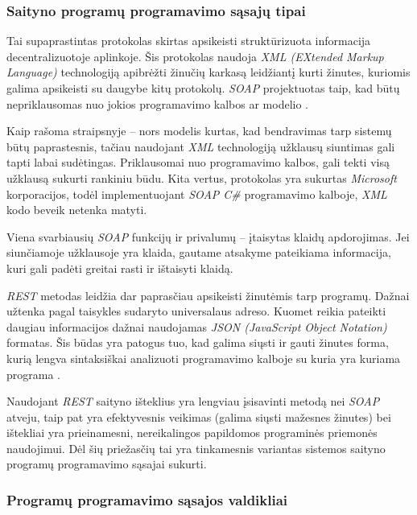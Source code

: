 \documentclass{VUMIFPSkursinis}
\begin{document}
\subsubsection{Saityno programų programavimo sąsajų tipai}


Tai supaprastintas protokolas skirtas apsikeisti struktūrizuota informacija decentralizuotoje aplinkoje. Šis protokolas naudoja \textit{XML (EXtended Markup Language)} technologiją apibrėžti žinučių karkasą leidžiantį kurti žinutes, kuriomis galima apsikeisti su daugybe kitų protokolų. \textit{SOAP} projektuotas taip, kad būtų nepriklausomas nuo jokios programavimo kalbos ar modelio \cite{SoapDocs}.

Kaip rašoma straipsnyje \cite{SoapRest} – nors modelis kurtas, kad bendravimas tarp sistemų būtų paprastesnis, tačiau naudojant \textit{XML} technologiją užklausų siuntimas gali tapti labai sudėtingas. Priklausomai nuo programavimo kalbos, gali tekti visą užklausą sukurti rankiniu būdu. Kita vertus, protokolas yra sukurtas \textit{Microsoft} korporacijos, todėl implementuojant \textit{SOAP C\#} programavimo kalboje, \textit{XML} kodo beveik netenka matyti.

Viena svarbiausių \textit{SOAP} funkcijų ir privalumų – įtaisytas klaidų apdorojimas. Jei siunčiamoje užklausoje yra klaida, gautame atsakyme pateikiama informacija, kuri gali padėti greitai rasti ir ištaisyti klaidą.


\textit{REST} metodas leidžia dar paprasčiau apsikeisti žinutėmis tarp programų. Dažnai užtenka pagal taisykles sudaryto universalaus adreso. Kuomet reikia pateikti daugiau informacijos dažnai naudojamas \textit{JSON (JavaScript Object Notation)} formatas. Šis būdas yra patogus tuo, kad galima siųsti ir gauti žinutes forma, kurią lengva sintaksiškai analizuoti programavimo kalboje su kuria yra kuriama programa \cite{SoapRest}.

Naudojant \textit{REST} saityno išteklius yra lengviau įsisavinti metodą nei \textit{SOAP} atveju, taip pat yra efektyvesnis veikimas (galima siųsti mažesnes žinutes) bei ištekliai yra prieinamesni, nereikalingos papildomos programinės priemonės naudojimui. Dėl šių priežasčių tai yra tinkamesnis variantas sistemos saityno programų programavimo sąsajai sukurti.

\subsubsection{Programų programavimo sąsajos valdikliai}
\end{document}
